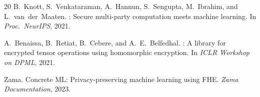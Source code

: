 \begin{thebibliography}{20}
B.~Knott, S.~Venkataraman, A.~Hannun, S.~Sengupta, M.~Ibrahim, and L.~van~der~Maaten.
: Secure multi-party computation meets machine learning.
\newblock In \emph{Proc.\ NeurIPS}, 2021.

A.~Benaissa, B.~Retiat, B.~Cebere, and A.~E.~Belfedhal.
: A library for encrypted tensor operations using homomorphic encryption.
\newblock In \emph{ICLR Workshop on DPML}, 2021.

{Zama}.
\newblock Concrete {ML}: Privacy-preserving machine learning using {FHE}.
\newblock \emph{Zama Documentation}, 2023.

\end{thebibliography}

